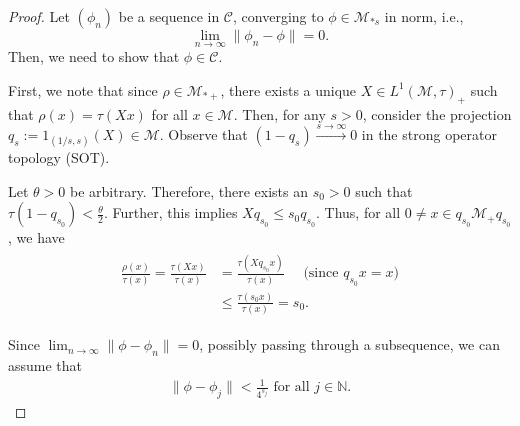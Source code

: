 \documentclass[10pt,a4paper]{amsart}
\begin{document}
    	\begin{proof}
		Let $(\phi_n)$ be a sequence in $\mathcal{C}$, converging to $\phi \in \mathcal{M}_{*s}$ in norm, i.e.,
		$$ \lim_{n \to \infty} \| \phi_n - \phi \| = 0. $$
		Then, we need to show that $\phi \in \mathcal{C}$. 
		
		First, we note that since $\rho \in \mathcal{M}_{*+}$, there exists a unique $X \in L^1(\mathcal{M}, \tau)_+$ such that $\rho(x) = \tau(Xx)$ for all $x \in \mathcal{M}$. Then, for any $s > 0$, consider the projection $q_s := 1_{(1/s, s)}(X) \in \mathcal{M}$. Observe that $(1 - q_s) \xrightarrow{s \to \infty} 0$ in the strong operator topology (SOT). 
		
		Let $\theta > 0$ be arbitrary. Therefore, there exists an $s_0 > 0$ such that $\tau(1 - q_{s_0}) < \frac{\theta}{2}$. Further, this implies $X q_{s_0} \leq s_0 q_{s_0}$. Thus, for all $0 \neq x \in q_{s_0} \mathcal{M}_+ q_{s_0}$, we have 
		\begin{align}\label{rho-tau}
			\begin{split}
				\frac{\rho(x)}{\tau(x)} = \frac{\tau(Xx)}{\tau(x)}&= \frac{\tau(X q_{s_0} x)}{\tau(x)} \quad \text{ (since $q_{s_0} x = x$)}\\
				&\leq \frac{\tau(s_0 x)}{\tau(x)} = s_0.
			\end{split} 
		\end{align}
		
		Since $ \lim_{n \to \infty} \| \phi - \phi_n \| = 0 $, possibly passing through a subsequence, we can assume that 
		\begin{align*}\label{coneq-3}
			\|\phi - \phi_j\| < \frac{1}{4^{s_j}} \text{ for all } j \in \mathbb{N}.
		\end{align*}
		

\end{proof}
\end{document}
